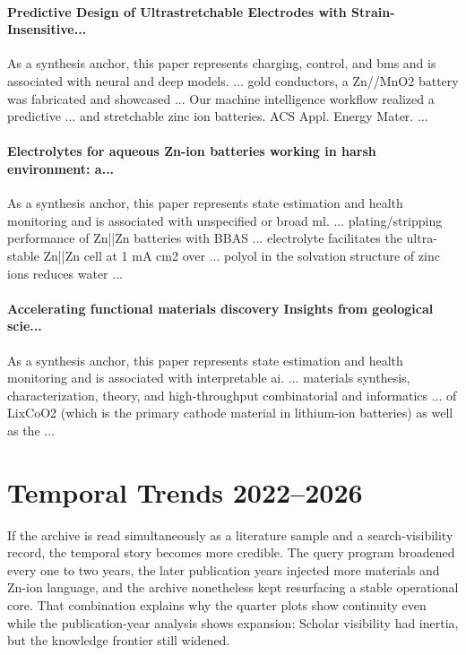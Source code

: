 \documentclass[journal]{IEEEtran}
\begin{document}
\paragraph{Predictive Design of Ultrastretchable Electrodes with Strain-Insensitive...} As a synthesis anchor, this paper represents charging, control, and bms and is associated with neural and deep models. ... gold conductors, a Zn//MnO2 battery was fabricated and showcased ... Our machine intelligence workflow realized a predictive ... and stretchable zinc ion batteries. ACS Appl. Energy Mater. ... \cite{predictivedesignof2024}

\paragraph{Electrolytes for aqueous Zn-ion batteries working in harsh environment: a...} As a synthesis anchor, this paper represents state estimation and health monitoring and is associated with unspecified or broad ml. ... plating/stripping performance of Zn||Zn batteries with BBAS ... electrolyte facilitates the ultra-stable Zn||Zn cell at 1 mA cm2 over ... polyol in the solvation structure of zinc ions reduces water ... \cite{electrolytesforaqueous2025}

\paragraph{Accelerating functional materials discovery Insights from geological scie...} As a synthesis anchor, this paper represents state estimation and health monitoring and is associated with interpretable ai. ... materials synthesis, characterization, theory, and high-throughput combinatorial and informatics ... of LixCoO2 (which is the primary cathode material in lithium-ion batteries) as well as the ... \cite{acceleratingfunctionalma2013}

\section{Temporal Trends 2022--2026}
If the archive is read simultaneously as a literature sample and a search-visibility record, the temporal story becomes more credible. The query program broadened every one to two years, the later publication years injected more materials and Zn-ion language, and the archive nonetheless kept resurfacing a stable operational core. That combination explains why the quarter plots show continuity even while the publication-year analysis shows expansion: Scholar visibility had inertia, but the knowledge frontier still widened.
\end{document}
